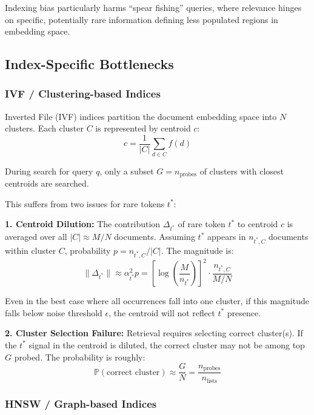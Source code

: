 \documentclass[conference,anonymous]{IEEEtran}
\begin{document}
Indexing bias particularly harms ``spear fishing'' queries, where relevance hinges on specific, potentially rare information defining less populated regions in embedding space.

\subsection{Index-Specific Bottlenecks}

\subsubsection{IVF / Clustering-based Indices}

Inverted File (IVF) indices partition the document embedding space into $N$ clusters. Each cluster $C$ is represented by centroid $c$:
\begin{equation}
c = \frac{1}{|C|}\sum_{d\in C} f(d)
\label{eq:centroid_calc}
\end{equation}

During search for query $q$, only a subset $G = n_{\text{probes}}$ of clusters with closest centroids are searched.

This suffers from two issues for rare tokens $t^*$:

\textbf{1. Centroid Dilution:} The contribution $\Delta_{t^*}$ of rare token $t^*$ to centroid $c$ is averaged over all $|C| \approx M/N$ documents. Assuming $t^*$ appears in $n_{t^*,C}$ documents within cluster $C$, probability $p = n_{t^*,C} / |C|$. The magnitude is:
\begin{equation}
\|\Delta_{t^*}\| \approx \alpha_{t^*}^2 p = \left[\log\left(\frac{M}{n_{t^*}}\right)\right]^2 \cdot \frac{n_{t^*,C}}{M/N}
\label{eq:centroid_signal_mag}
\end{equation}

Even in the best case where all occurrences fall into one cluster, if this magnitude falls below noise threshold $\epsilon$, the centroid will not reflect $t^*$ presence.

\textbf{2. Cluster Selection Failure:} Retrieval requires selecting correct cluster(s). If the $t^*$ signal in the centroid is diluted, the correct cluster may not be among top $G$ probed. The probability is roughly:
\begin{equation}
\mathbb{P}(\text{correct cluster}) \approx \frac{G}{N} = \frac{n_{\text{probes}}}{n_{\text{lists}}}
\label{eq:ivf_probe_prob}
\end{equation}

\subsubsection{HNSW / Graph-based Indices}
\end{document}
